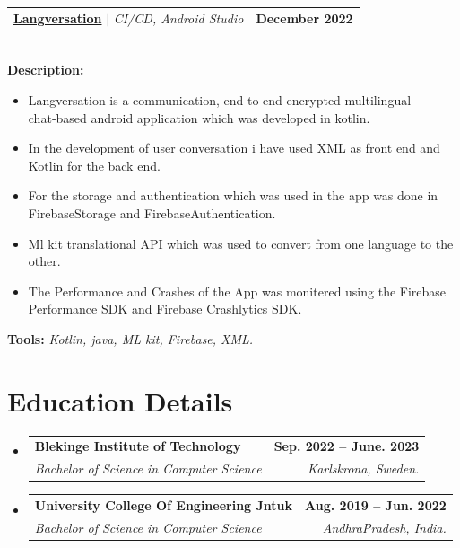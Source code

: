 \documentclass[letterpaper,11pt]{article}
\makeatletter
\newcommand{\resumeItem}[1]{
  \item\small{
    {#1 \vspace{-2pt}}
  }
}
\newcommand{\resumeSubheading}[4]{
  \vspace{-2pt}\item
    \begin{tabular*}{1.0\textwidth}[t]{l@{\extracolsep{\fill}}r}
      \textbf{#1} & \textbf{\small #2} \\
      \textit{\small#3} & \textit{\small #4} \\
    \end{tabular*}\vspace{-7pt}
}
\newcommand{\resumeProjectHeading}[2]{
    \item
    \begin{tabular*}{1.001\textwidth}{l@{\extracolsep{\fill}}r}
      \small#1 & \textbf{\small #2}\\
    \end{tabular*}\vspace{-7pt}
}
\newcommand{\resumeSubHeadingListStart}{\begin{itemize}[leftmargin=0.0in, label={}]}
\newcommand{\resumeSubHeadingListEnd}{\end{itemize}}
\newcommand{\resumeItemListStart}{\begin{itemize}}
\newcommand{\resumeItemListEnd}{\end{itemize}\vspace{-5pt}}
\makeatother
\begin{document}
                
                            

    \resumeProjectHeading          {\textbf{\href{https://github.com/saiyakkshit/Langversation}{Langversation}} $|$ \emph{CI/CD, Android Studio \faGithub}}{December 2022}\\
          \vspace{6pt}
          \textbf{Description:}
         
          \vspace{-8pt}
          \resumeItemListStart
            \resumeItem{ Langversation is a communication, end‑to‑end encrypted multilingual chat‑based android application which was developed in kotlin.}
            \resumeItem{In the development of user conversation i have used XML as front end and Kotlin for the back end.}
            \resumeItem{For the storage and authentication which was used in the app was done in FirebaseStorage and FirebaseAuthentication.}
            \resumeItem{Ml kit translational API which was used to convert from one language to the other.}
            \resumeItem{The Performance and Crashes of the App was monitered using the Firebase Performance SDK and Firebase Crashlytics SDK.}
          \resumeItemListEnd 
          \textbf{Tools:}\emph{
Kotlin, java, ML kit, Firebase, XML.}

                


\section{Education Details  \faGraduationCap   }

 
  \resumeSubHeadingListStart
    \resumeSubheading
      {Blekinge Institute of Technology}{Sep. 2022 -- June. 2023}
      {Bachelor of Science in Computer Science}{\faMapMarker  Karlskrona, Sweden.}
  \resumeSubHeadingListEnd
    \vspace{-7pt}
  \resumeSubHeadingListStart
    \resumeSubheading
      {University College Of Engineering Jntuk}{Aug. 2019 -- Jun. 2022}
      {Bachelor of Science in Computer Science}{\faMapMarker  AndhraPradesh, India.}
  \resumeSubHeadingListEnd
  \vspace{-10pt}
\end{document}
